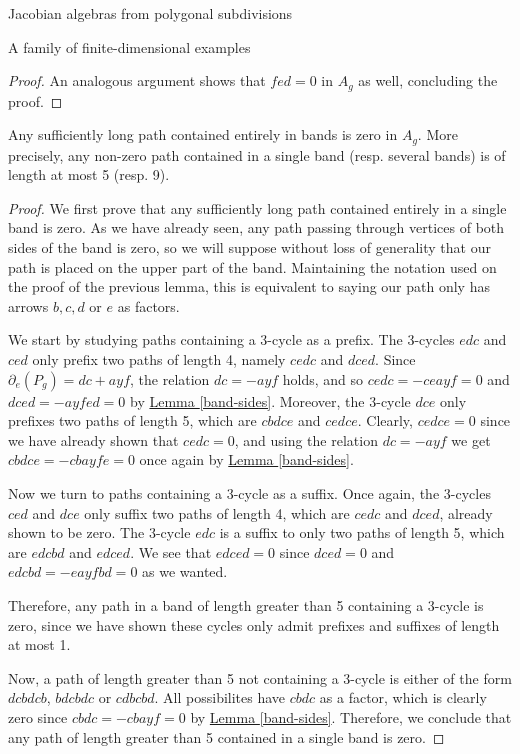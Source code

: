 \begin{chapter}{Jacobian algebras from polygonal subdivisions}
\begin{section}{A family of finite-dimensional examples}
\begin{proof}
An analogous argument shows that $fed=0$ in $A_g$ as well, concluding the proof. 
\end{proof}

\begin{lemma}\label{long-band-paths} Any sufficiently long path contained entirely in bands is zero in $A_g$. More precisely, any non-zero path contained in a single band (resp. several bands) is of length at most 5 (resp. 9).
\end{lemma}
\begin{proof} We first prove that any sufficiently long path contained entirely in a single band is zero. As we have already seen, any path passing through vertices of both sides of the band is zero, so we will suppose without loss of generality that our path is placed on the upper part of the band. Maintaining the notation used on the proof of the previous lemma, this is equivalent to saying our path only has arrows $b, c, d$ or $e$ as factors.

We start by studying paths containing a $3$-cycle as a prefix. The $3$-cycles $edc$ and $ced$ only prefix two paths of length 4, namely $cedc$ and $dced$. Since $\partial_e(P_g) = dc + ayf$, the relation $dc = -ayf$ holds, and so $cedc=-ceayf=0$ and $dced=-ayfed=0$ by \hyperref[band-sides]{Lemma \ref*{band-sides}}. Moreover, the $3$-cycle $dce$ only prefixes two paths of length 5, which are $cbdce$ and $cedce$. Clearly, $cedce=0$ since we have already shown that $cedc=0$, and using the relation $dc=-ayf$ we get $cbdce = - cbayfe=0$ once again by \hyperref[band-sides]{Lemma \ref*{band-sides}}.

Now we turn to paths containing a $3$-cycle as a suffix. Once again, the $3$-cycles $ced$ and $dce$ only suffix two paths of length 4, which are $cedc$ and $dced$, already shown to be zero. The $3$-cycle $edc$ is a suffix to only two paths of length 5, which are $edcbd$ and $edced$. We see that $edced=0$ since $dced=0$ and $edcbd=-eayfbd=0$ as we wanted.

Therefore, any path in a band of length greater than 5 containing a 3-cycle is zero, since we have shown these cycles only admit prefixes and suffixes of length at most 1.

Now, a path of length greater than 5 not containing a 3-cycle is either of the form $dcbdcb$, $bdcbdc$ or $cdbcbd$. All possibilites have $cbdc$ as a factor, which is clearly zero since $cbdc = -cbayf = 0$ by \hyperref[band-sides]{Lemma \ref*{band-sides}}. Therefore, we conclude that any path of length greater than 5 contained in a single band is zero.


\end{proof}
\end{section}
\end{chapter}
